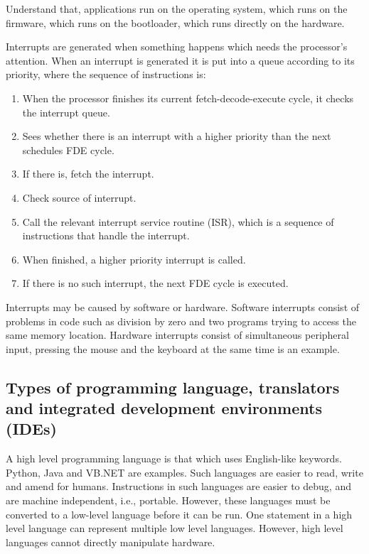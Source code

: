Understand that, applications run on the operating system, which runs on the firmware, which runs
on the bootloader, which runs directly on the hardware.

Interrupts are generated when something happens which needs the processor's attention. When an
interrupt is generated it is put into a queue according to its priority, where the sequence of
instructions is:

\begin{enumerate}
	\item When the processor finishes its current fetch-decode-execute cycle, it checks the
		interrupt queue.
	\item Sees whether there is an interrupt with a higher priority than the next schedules FDE
		cycle.
	\item If there is, fetch the interrupt.
	\item Check source of interrupt.
	\item Call the relevant interrupt service routine (ISR), which is a sequence of instructions
		that handle the interrupt.
	\item When finished, a higher priority interrupt is called.
	\item If there is no such interrupt, the next FDE cycle is executed.
\end{enumerate}

Interrupts may be caused by software or hardware. Software interrupts consist of problems in code
such as division by zero and two programs trying to access the same memory location. Hardware
interrupts consist of simultaneous peripheral input, pressing the mouse and the keyboard at the
same time is an example.

\subsection{Types of programming language, translators and integrated development environments (IDEs)}

A high level programming language is that which uses English-like keywords. Python, Java and
VB.NET are examples. Such languages are easier to read, write and amend for humans. Instructions
in such languages are easier to debug, and are machine independent, i.e., portable. However,
these languages must be converted to a low-level language before it can be run. One statement
in a high level language can represent multiple low level languages. However, high level languages
cannot directly manipulate hardware.

